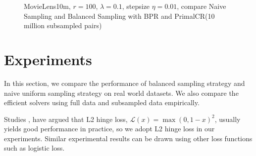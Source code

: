 \documentclass[conference]{IEEEtran}
\numberwithin{equation}{section}
\newtheorem{sampling strategy}{Sampling Strategy}
\begin{document}
\begin{figure}[t!]
\caption{MovieLens10m, $r=100$, $\lambda = 0.1$, stepsize $\eta = 0.01$, compare Naive Sampling and Balanced Sampling with BPR and PrimalCR(10 million subsampled pairs)}
\label{fig:10m_sample}

\end{figure}

\section{Experiments}
\label{sec:exp}

In this section, we compare the performance of balanced sampling strategy and naive uniform sampling strategy on real world datasets. {\color We also compare the efficient solvers using full data and subsampled data empirically}.

Studies \cite{cr}, \cite{crlinear} have argued that L2 hinge loss, $\mathcal{L}(x) = \max(0, 1- x)^2$, usually yields good performance in practice, so we adopt L2 hinge loss in our experiments. Similar experimental results can be drawn using other loss functions such as logistic loss. %
\end{document}
